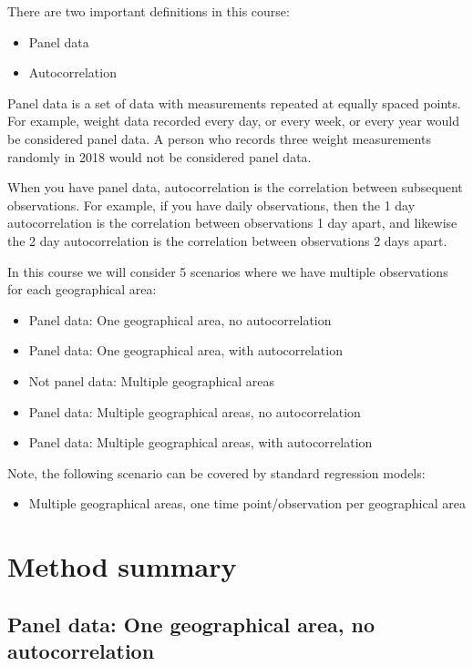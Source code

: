 \documentclass[]{book}
\providecommand{\tightlist}{%
  \setlength{\itemsep}{0pt}\setlength{\parskip}{0pt}}
\begin{document}
There are two important definitions in this course:

\begin{itemize}
\tightlist
\item
  Panel data
\item
  Autocorrelation
\end{itemize}

Panel data is a set of data with measurements repeated at equally spaced
points. For example, weight data recorded every day, or every week, or
every year would be considered panel data. A person who records three
weight measurements randomly in 2018 would not be considered panel data.

When you have panel data, autocorrelation is the correlation between
subsequent observations. For example, if you have daily observations,
then the 1 day autocorrelation is the correlation between observations 1
day apart, and likewise the 2 day autocorrelation is the correlation
between observations 2 days apart.

In this course we will consider 5 scenarios where we have multiple
observations for each geographical area:

\begin{itemize}
\tightlist
\item
  Panel data: One geographical area, no autocorrelation
\item
  Panel data: One geographical area, with autocorrelation
\item
  Not panel data: Multiple geographical areas
\item
  Panel data: Multiple geographical areas, no autocorrelation
\item
  Panel data: Multiple geographical areas, with autocorrelation
\end{itemize}

Note, the following scenario can be covered by standard regression
models:

\begin{itemize}
\tightlist
\item
  Multiple geographical areas, one time point/observation per
  geographical area
\end{itemize}

\newpage

\section{Method summary}\label{method-summary}

\subsection{Panel data: One geographical area, no
autocorrelation}\label{panel-data-one-geographical-area-no-autocorrelation}
\end{document}
